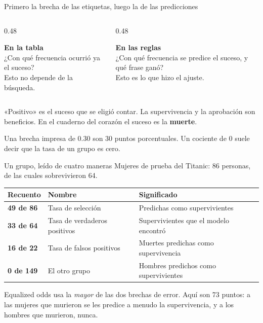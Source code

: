 \documentclass[aspectratio=169,11pt]{beamer}
\begin{document}
\begin{frame}{Primero la brecha de las etiquetas, luego la de las predicciones}
  \begin{columns}[T]
    \begin{column}{0.48\textwidth}
      \colorbox{ebdbluepale}{\parbox[t]{0.92\textwidth}{%
        \raggedright
        {\color{ebdnavy}\textbf{En la tabla}}\\[0.35em]
        ¿Con qué frecuencia ocurrió ya el suceso?\\[0.3em]
        {\small Esto no depende de la búsqueda.}\par}}
    \end{column}
    \begin{column}{0.48\textwidth}
      \colorbox{ebdsage}{\parbox[t]{0.92\textwidth}{%
        \raggedright
        {\color{ebdgreen}\textbf{En las reglas}}\\[0.35em]
        ¿Con qué frecuencia se predice el suceso, y qué frase ganó?\\[0.3em]
        {\small Esto es lo que hizo el ajuste.}\par}}
    \end{column}
  \end{columns}
  \vspace{0.55em}
  «Positivo» es el suceso que se eligió contar. La supervivencia y la aprobación son beneficios. En el cuaderno del corazón el suceso es la \textbf{muerte}.
  \vspace{0.35em}

  {\small Una brecha impresa de \(0.30\) son 30 puntos porcentuales. Un cociente de 0 suele decir que la tasa de un grupo es cero.}
\end{frame}

\begin{frame}{Un grupo, leído de cuatro maneras}
  Mujeres de prueba del Titanic: 86 personas, de las cuales sobrevivieron 64.
  \vspace{0.35em}

  \renewcommand{\arraystretch}{1.18}
  \begin{tabular}{@{}l l l@{}}
    \toprule
    Recuento & Nombre & Significado \\
    \midrule
    \textbf{49 de 86} & Tasa de selección & Predichas como supervivientes \\
    \textbf{33 de 64} & Tasa de verdaderos positivos & Supervivientes que el modelo encontró \\
    \textbf{16 de 22} & Tasa de falsos positivos & Muertes predichas como supervivencia \\
    \textbf{0 de 149} & El otro grupo & Hombres predichos como supervivientes \\
    \bottomrule
  \end{tabular}

  \vspace{0.35em}
  {\small Equalized odds usa la \emph{mayor} de las dos brechas de error. Aquí son 73 puntos: a las mujeres que murieron se les predice a menudo la supervivencia, y a los hombres que murieron, nunca.}
\end{frame}
\end{document}
